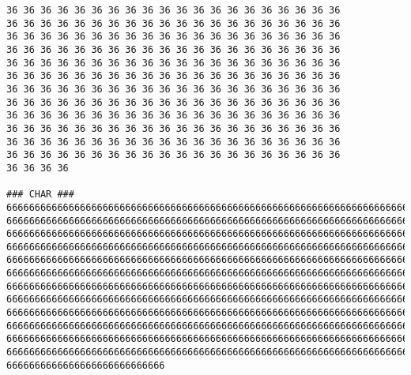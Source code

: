 \documentclass[11pt,letterpaper]{article}
\begin{document}
{\begin{verbatim}
36 36 36 36 36 36 36 36 36 36 36 36 36 36 36 36 36 36 36 36 
36 36 36 36 36 36 36 36 36 36 36 36 36 36 36 36 36 36 36 36 
36 36 36 36 36 36 36 36 36 36 36 36 36 36 36 36 36 36 36 36 
36 36 36 36 36 36 36 36 36 36 36 36 36 36 36 36 36 36 36 36 
36 36 36 36 36 36 36 36 36 36 36 36 36 36 36 36 36 36 36 36 
36 36 36 36 36 36 36 36 36 36 36 36 36 36 36 36 36 36 36 36 
36 36 36 36 36 36 36 36 36 36 36 36 36 36 36 36 36 36 36 36 
36 36 36 36 36 36 36 36 36 36 36 36 36 36 36 36 36 36 36 36 
36 36 36 36 36 36 36 36 36 36 36 36 36 36 36 36 36 36 36 36 
36 36 36 36 36 36 36 36 36 36 36 36 36 36 36 36 36 36 36 36 
36 36 36 36 36 36 36 36 36 36 36 36 36 36 36 36 36 36 36 36 
36 36 36 36 36 36 36 36 36 36 36 36 36 36 36 36 36 36 36 36 
36 36 36 36 

### CHAR ###
6666666666666666666666666666666666666666666666666666666666666666666666666666666
6666666666666666666666666666666666666666666666666666666666666666666666666666666
6666666666666666666666666666666666666666666666666666666666666666666666666666666
6666666666666666666666666666666666666666666666666666666666666666666666666666666
6666666666666666666666666666666666666666666666666666666666666666666666666666666
6666666666666666666666666666666666666666666666666666666666666666666666666666666
6666666666666666666666666666666666666666666666666666666666666666666666666666666
6666666666666666666666666666666666666666666666666666666666666666666666666666666
6666666666666666666666666666666666666666666666666666666666666666666666666666666
6666666666666666666666666666666666666666666666666666666666666666666666666666666
6666666666666666666666666666666666666666666666666666666666666666666666666666666
6666666666666666666666666666666666666666666666666666666666666666666666666666666
6666666666666666666666666666

\end{verbatim}
}
\end{document}
